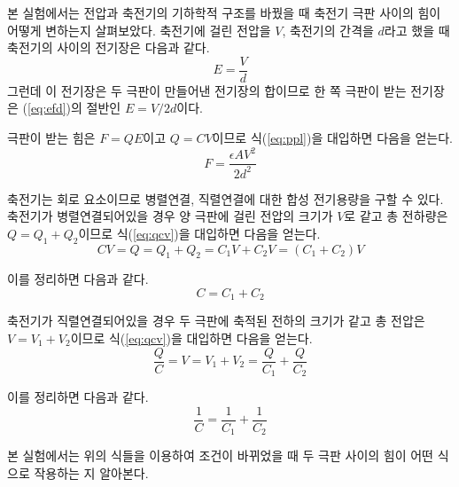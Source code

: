 \documentclass[a4paper, 8pt]{article}
\begin{document}
\newpage
	본 실험에서는 전압과 축전기의 기하학적 구조를 바꿨을 때 축전기 극판 사이의 힘이 어떻게 변하는지 살펴보았다. 축전기에 걸린 전압을 $V$, 축전기의 간격을 $d$라고 했을 때 축전기의 사이의 전기장은 다음과 같다.
		\begin{equation} \label{eq:efd}
			E=\frac{V}{d}
		\end{equation}
	그런데 이 전기장은 두 극판이 만들어낸 전기장의 합이므로 한 쪽 극판이 받는 전기장은 (\ref{eq:efd})의 절반인 $E=V/{2d}$이다.

	극판이 받는 힘은 $F=QE$이고 $Q=CV$이므로 식(\ref{eq:ppl})을 대입하면 다음을 얻는다. 
		\begin{equation} \label{eq:force}
			F=\frac{\epsilon{}AV^{2}}{2d^{2}}
		\end{equation}


	축전기는 회로 요소이므로 병렬연결, 직렬연결에 대한 합성 전기용량을 구할 수 있다.
	축전기가 병렬연결되어있을 경우 양 극판에 걸린 전압의 크기가 $V$로 같고 총 전하량은 $Q=Q_1+Q_2$이므로 식(\ref{eq:qcv})을 대입하면 다음을 얻는다. 
		\begin{equation}
			CV=Q=Q_{1}+Q_{2}=C_{1}V+C_{2}V=(C_{1}+C_{2})V 
		\end{equation}

	이를 정리하면 다음과 같다.
		\begin{equation}
			C=C_{1}+C_{2}
		\end{equation}
	
	축전기가 직렬연결되어있을 경우 두 극판에 축적된 전하의 크기가 같고 총 전압은 $V=V_1+V_2$이므로 식(\ref{eq:qcv})을 대입하면 다음을 얻는다.
		\begin{equation}
			\frac{Q}{C}=V=V_{1}+V_{2}=\frac{Q}{C_1}+\frac{Q}{C_2}
		\end{equation}

	이를 정리하면 다음과 같다.
		\begin{equation}
			\frac{1}{C}=\frac{1}{C_1}+\frac{1}{C_2}
		\end{equation} 


	본 실험에서는 위의 식들을 이용하여 조건이 바뀌었을 때 두 극판 사이의 힘이 어떤 식으로 작용하는 지 알아본다. 

\newpage
\end{document}
